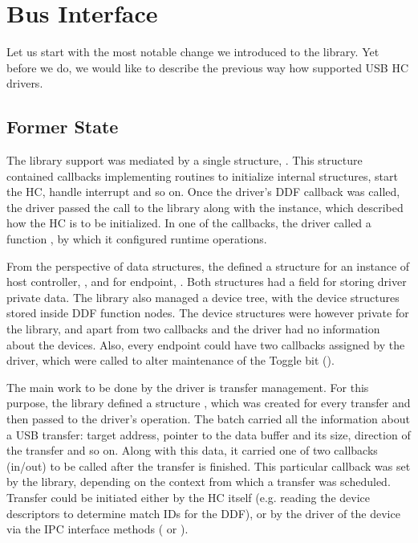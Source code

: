 \section{Bus Interface}
\label{sec:bus}

Let us start with the most notable change we introduced to the 
library. Yet before we do, we would like to describe the previous way how
 supported USB HC drivers.

\subsection{Former State}

The library support was mediated by a single structure,
. This structure contained callbacks implementing
routines to initialize internal structures, start the HC, handle interrupt and
so on. Once the driver's DDF callback  was called, the driver
passed the call to the library along with the 
instance, which described how the HC is to be initialized. In one of the
callbacks, the driver called a function , by which
it configured runtime operations.

From the perspective of data structures, the  defined
a structure for an instance of host controller, , and for
endpoint, . Both structures had a field for storing driver
private data. The library also managed a device tree, with the device
structures stored inside DDF function nodes. The device structures were however
private for the library, and apart from two callbacks  and
 the driver had no information about the devices. Also,
every endpoint could have two callbacks assigned by the driver, which were
called to alter maintenance of the Toggle bit ().

The main work to be done by the driver is transfer management. For this
purpose, the library defined a structure , which
was created for every transfer and then passed to the driver's 
operation. The batch carried all the information about a USB transfer: target
address, pointer to the data buffer and its size, direction of the transfer and
so on. Along with this data, it carried one of two callbacks (in/out) to be
called after the transfer is finished. This particular callback was set by the
library, depending on the context from which a transfer was scheduled. Transfer
could be initiated either by the HC itself (e.g. reading the device descriptors
to determine match IDs for the DDF), or by the driver of the device via the IPC
interface methods ( or ).

